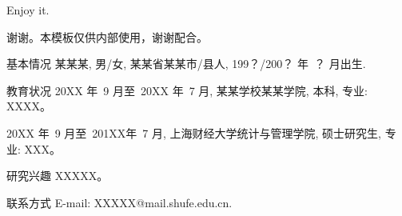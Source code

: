 \documentclass{sufethesismas}
\begin{document}
Enjoy it.
\newline%



	




谢谢。本模板仅供内部使用，谢谢配合。



%
%
\begin{resume}

\begin{resumesection}{基本情况}
某某某, 男/女, 某某省某某市/县人, 199？/200？ 年~？ 月出生.
\end{resumesection}

\begin{resumelist}{教育状况}
20XX 年~9 月至~20XX 年~7 月, 某某学校某某学院, 本科, 专业: XXXX。

20XX 年~9 月至~201XX年~7 月, 上海财经大学统计与管理学院, 硕士研究生, 专业: XXX。
\end{resumelist}
%


\begin{resumesection}{研究兴趣}
XXXXX。
\end{resumesection}

\begin{resumesection}{联系方式}
E-mail: XXXXX@mail.shufe.edu.cn.
\end{resumesection}
%
\end{resume}
\end{document}
